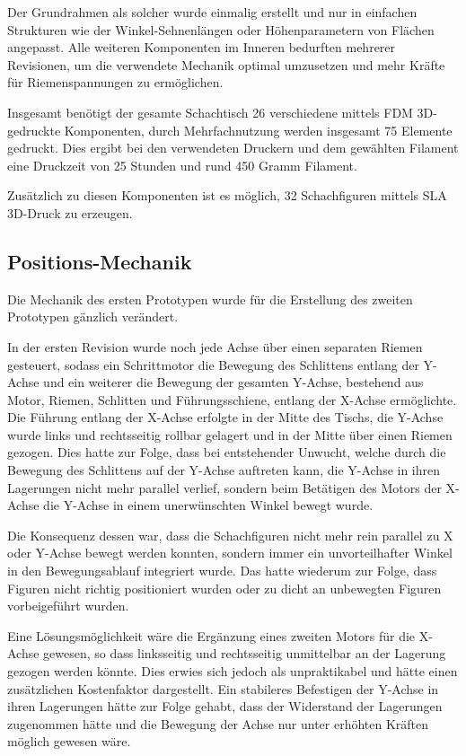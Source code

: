 Der Grundrahmen als solcher wurde einmalig erstellt und nur in einfachen
Strukturen wie der Winkel-Sehnenlängen oder Höhenparametern von Flächen
angepasst. Alle weiteren Komponenten im Inneren bedurften mehrerer
Revisionen, um die verwendete Mechanik optimal umzusetzen und mehr
Kräfte für Riemenspannungen zu ermöglichen.

Insgesamt benötigt der gesamte Schachtisch 26 verschiedene mittels FDM
3D-gedruckte Komponenten, durch Mehrfachnutzung werden insgesamt 75
Elemente gedruckt. Dies ergibt bei den verwendeten Druckern und dem
gewählten Filament eine Druckzeit von 25 Stunden und rund 450 Gramm
Filament.

Zusätzlich zu diesen Komponenten ist es möglich, 32 Schachfiguren
mittels SLA 3D-Druck zu erzeugen.

\hypertarget{positions-mechanik}{%
\subsection{Positions-Mechanik}\label{positions-mechanik}}

Die Mechanik des ersten Prototypen wurde für die Erstellung des zweiten
Prototypen gänzlich verändert.

In der ersten Revision wurde noch jede Achse über einen separaten Riemen
gesteuert, sodass ein Schrittmotor die Bewegung des Schlittens entlang
der Y-Achse und ein weiterer die Bewegung der gesamten Y-Achse,
bestehend aus Motor, Riemen, Schlitten und Führungsschiene, entlang der
X-Achse ermöglichte. Die Führung entlang der X-Achse erfolgte in der
Mitte des Tischs, die Y-Achse wurde links und rechtsseitig rollbar
gelagert und in der Mitte über einen Riemen gezogen. Dies hatte zur
Folge, dass bei entstehender Unwucht, welche durch die Bewegung des
Schlittens auf der Y-Achse auftreten kann, die Y-Achse in ihren
Lagerungen nicht mehr parallel verlief, sondern beim Betätigen des
Motors der X-Achse die Y-Achse in einem unerwünschten Winkel bewegt
wurde.

Die Konsequenz dessen war, dass die Schachfiguren nicht mehr rein
parallel zu X oder Y-Achse bewegt werden konnten, sondern immer ein
unvorteilhafter Winkel in den Bewegungsablauf integriert wurde. Das
hatte wiederum zur Folge, dass Figuren nicht richtig positioniert wurden
oder zu dicht an unbewegten Figuren vorbeigeführt wurden.

Eine Lösungsmöglichkeit wäre die Ergänzung eines zweiten Motors für die
X-Achse gewesen, so dass linksseitig und rechtsseitig unmittelbar an der
Lagerung gezogen werden könnte. Dies erwies sich jedoch als
unpraktikabel und hätte einen zusätzlichen Kostenfaktor dargestellt. Ein
stabileres Befestigen der Y-Achse in ihren Lagerungen hätte zur Folge
gehabt, dass der Widerstand der Lagerungen zugenommen hätte und die
Bewegung der Achse nur unter erhöhten Kräften möglich gewesen wäre.


